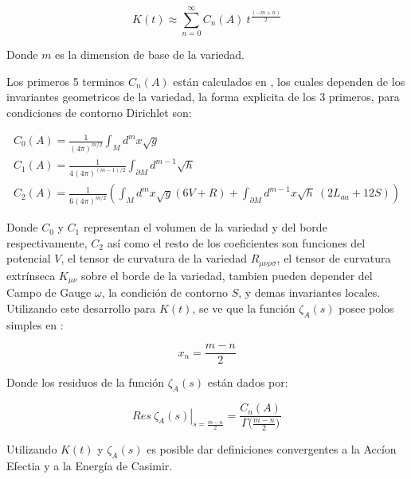 \begin{equation}
K(t) \approx 
\sum _{n=0} ^{\infty}
C _n (A) \ 
t ^{\frac{(-m+n)}{2}} 
\label{eq.heat.expansion}
\end{equation}


Donde $m$ es la dimension de base de la variedad.


Los primeros 5 terminos $C _n (A) $ están calculados en \cite{VASSILEVICH2003279}, los cuales dependen de los invariantes geometricos de la variedad, la forma explicita de los 3 primeros, para condiciones de contorno Dirichlet son: 

\begin{equation}
\begin{array}{c}
C _0 (A) = \frac{1}{(4 \pi ) ^{m/2} }  \int  _{M} d ^m x \sqrt{g}  \\[10pt]
C _1 (A) = \frac{ 1 }{4 (4 \pi ) ^{(m-1)/2} } \int _{\partial M } d ^{m-1} \sqrt{h} \\[10pt]
C _2 (A) = \frac{ 1 }{6 (4 \pi) ^{m/2} } \left(
									\int _M d ^m x\sqrt{g} (6 V + R) +
									\int _{\partial M } d ^{m-1} x 
									\sqrt{h} \ ( 2 L _{aa} + 12 S )
									\right)
\end{array}
\label{coef}
\end{equation} 

Donde $C _0$ y $C _1$ representan el volumen de la variedad y del borde respectivamente, $C _2$ así como el resto de los coeficientes son funciones del potencial $V$, el tensor de curvatura de la variedad $R _{\mu \nu \rho \sigma }$, el tensor de curvatura extrínseca $K _{\mu \nu }$ sobre el borde de la variedad, tambien pueden depender del Campo de Gauge $\omega $, la condición de contorno $S$, y demas invariantes locales.  \\


Utilizando este desarrollo para $K(t)$, se ve que la función $\zeta _A (s)$ posee polos simples en :


\begin{equation}
x _n = \frac{m-n}{2} 
\label{eq.ceros.zeta}
\end{equation}


Donde los residuos de la función $\zeta _A (s) $ están dados por:

\begin{equation}
\left. Res \ \zeta _A (s)  \right| _{s= \frac{m - n}{2}} =  
\frac{ C_n  (A) }{ {\Gamma ( \frac{m-n}{2}} ) }
\label{losresi}
\end{equation}


Utilizando $K(t)$ y $\zeta _A (s) $ es posible dar definiciones convergentes a la Accíon Efectia y a la Energía de Casimir.




